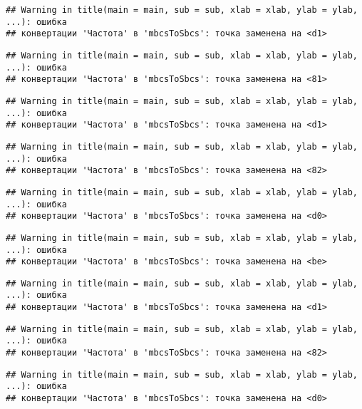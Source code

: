 \documentclass[
]{article}
\begin{document}
\begin{verbatim}
## Warning in title(main = main, sub = sub, xlab = xlab, ylab = ylab, ...): ошибка
## конвертации 'Частота' в 'mbcsToSbcs': точка заменена на <d1>
\end{verbatim}

\begin{verbatim}
## Warning in title(main = main, sub = sub, xlab = xlab, ylab = ylab, ...): ошибка
## конвертации 'Частота' в 'mbcsToSbcs': точка заменена на <81>
\end{verbatim}

\begin{verbatim}
## Warning in title(main = main, sub = sub, xlab = xlab, ylab = ylab, ...): ошибка
## конвертации 'Частота' в 'mbcsToSbcs': точка заменена на <d1>
\end{verbatim}

\begin{verbatim}
## Warning in title(main = main, sub = sub, xlab = xlab, ylab = ylab, ...): ошибка
## конвертации 'Частота' в 'mbcsToSbcs': точка заменена на <82>
\end{verbatim}

\begin{verbatim}
## Warning in title(main = main, sub = sub, xlab = xlab, ylab = ylab, ...): ошибка
## конвертации 'Частота' в 'mbcsToSbcs': точка заменена на <d0>
\end{verbatim}

\begin{verbatim}
## Warning in title(main = main, sub = sub, xlab = xlab, ylab = ylab, ...): ошибка
## конвертации 'Частота' в 'mbcsToSbcs': точка заменена на <be>
\end{verbatim}

\begin{verbatim}
## Warning in title(main = main, sub = sub, xlab = xlab, ylab = ylab, ...): ошибка
## конвертации 'Частота' в 'mbcsToSbcs': точка заменена на <d1>
\end{verbatim}

\begin{verbatim}
## Warning in title(main = main, sub = sub, xlab = xlab, ylab = ylab, ...): ошибка
## конвертации 'Частота' в 'mbcsToSbcs': точка заменена на <82>
\end{verbatim}

\begin{verbatim}
## Warning in title(main = main, sub = sub, xlab = xlab, ylab = ylab, ...): ошибка
## конвертации 'Частота' в 'mbcsToSbcs': точка заменена на <d0>
\end{verbatim}
\end{document}
